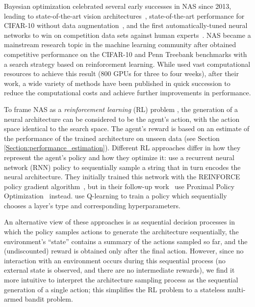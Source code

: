 \documentclass[twoside,11pt]{article}
\renewcommand{\cite}[1]{\citep{#1}}
\newcommand{\note}[1]{
	\noindent~\\
	\vspace{0.25cm}
	\fcolorbox{red}{yellow}{\parbox{0.97\textwidth}{#1\\}}
	\vspace{0.25cm}
}
\begin{document}
Bayesian optimization celebrated several early successes in NAS since 2013, leading to state-of-the-art vision architectures~\cite{Bergstra2013MakingAS}, state-of-the-art performance for CIFAR-10 without data augmentation~\cite{DomSprHut15}, and the first automatically-tuned neural networks to win on competition data sets against human experts~\cite{mendoza_towards_2016}. 
NAS became a mainstream research topic in the machine learning community after \citet{DBLP:journals/corr/ZophL16} obtained competitive performance on the CIFAR-10 and Penn Treebank benchmarks with a search strategy based on reinforcement learning. While \citet{DBLP:journals/corr/ZophL16} used vast computational resources to achieve this result (800 GPUs for three to four weeks), after their work, a wide variety of methods have been published in quick succession to reduce the computational costs and achieve further improvements in performance.

To frame NAS as a \emph{reinforcement learning} (RL) problem \citep{DBLP:journals/corr/BakerGNR16, DBLP:journals/corr/ZophL16, zhong_practical_2017, DBLP:journals/corr/ZophVSL17}, the generation of a neural architecture can be considered to be the agent's action, with the action space identical to the search space. The agent's reward is based on an estimate of the performance of the trained architecture on unseen data (see Section \ref{Section:performance_estimation}). Different RL approaches differ in how they represent the agent's policy and how they optimize it: \citet{DBLP:journals/corr/ZophL16} use a recurrent neural network (RNN) policy to sequentially sample a string that in turn encodes the neural architecture. They initially trained this network with the REINFORCE policy gradient algorithm~\citep{Williams1992}, but in their follow-up work~\citep{DBLP:journals/corr/ZophVSL17} use Proximal Policy Optimization~\citep{DBLP:journals/corr/SchulmanWDRK17} instead. \citet{DBLP:journals/corr/BakerGNR16} use Q-learning to train a policy which sequentially chooses a layer's type and corresponding hyperparameters. 

An alternative view of these approaches is as sequential decision processes in which the policy samples actions to generate the architecture sequentially, the environment's ``state'' contains a summary of the actions sampled so far, and the (undiscounted) reward is obtained only after the final action. However, since no interaction with an environment occurs during this sequential process (no external state is observed, and there are no intermediate rewards), we find it more intuitive to interpret the architecture sampling process as the sequential generation of a single action; this simplifies the RL problem to a stateless multi-armed bandit problem.
\end{document}
